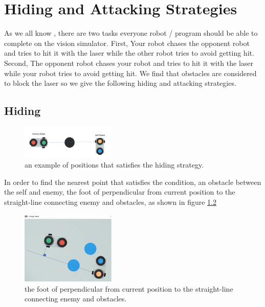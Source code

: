 \chapter{Hiding and Attacking Strategies}
\label{cha:STRATEGIES}

As we all know , there are two tasks everyone robot / program should be able to complete on the vision simulator. First, Your robot chases the opponent robot and tries to hit it with the laser while the other robot tries to avoid getting hit. Second, The opponent robot chases your robot and tries to hit it with the laser while your robot tries to avoid getting hit. We find that obstacles are considered to block the laser so we give the following hiding and attacking strategies. 


\section{Hiding}
\begin{figure}[thb]
    \centering
    \includegraphics[width=0.4\textwidth]{images/hiding_strategy.png}
    \caption[hiding strategy]{an example of positions that satisfies the hiding strategy.}\label{hiding_strategy}
\end{figure}

In order to find the nearest point that satisfies the condition, an obstacle between the self and enemy, the foot of perpendicular from current position to the straight-line connecting enemy and obstacles, as shown in figure \ref{hiding_implement1}

\begin{figure}[thb]
    \centering
    \includegraphics[width=0.4\textwidth]{images/implementofhiding1.png}
    \caption[he foot of perpendicular from current position to the straight-line connecting enemy and obstacles]{the foot of perpendicular from current position to the straight-line connecting enemy and obstacles.}\label{hiding_implement1}
\end{figure}

